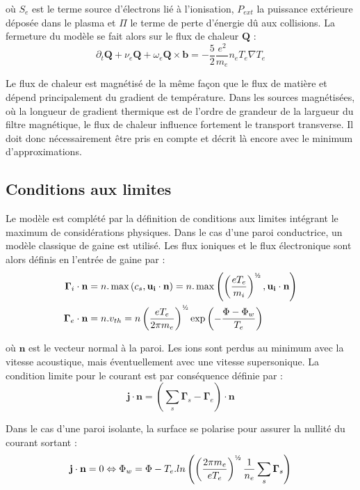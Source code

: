où $S_e$ est le terme source d'électrons lié à l'ionisation, $P_{ext}$ la puissance extérieure déposée dans le plasma
 et $\Pi$ le terme de perte d'énergie dû aux collisions. La fermeture du modèle se fait alors sur le flux de chaleur $\mathbf{Q}$ 
 \cite{Golant} :
\begin{equation}
	\partial_t \mathbf{Q} + \nu_e\mathbf{Q}+\omega_e\mathbf{Q}\times\mathbf{b} = -\frac{5}{2}\frac{e^2}{m_e}n_eT_e\nabla T_e
\end{equation}

Le flux de chaleur est magnétisé de la même façon que le flux de matière et dépend principalement 
du gradient de température. Dans les sources magnétisées, où la longueur de gradient thermique est de 
l'ordre de grandeur de la largueur du filtre magnétique, le flux de chaleur influence fortement le transport
transverse. Il doit donc nécessairement être pris en compte et décrit là encore avec le minimum d'approximations.
 
\subsection{Conditions aux limites}
Le modèle est complété par la définition de conditions aux limites intégrant le maximum de 
considérations physiques. Dans le cas d'une paroi conductrice, un modèle classique de gaine est utilisé. Les 
flux ioniques et le flux électronique sont alors définis en l'entrée de gaine par : 
\begin{align}
	\boldsymbol{\Gamma}_i\cdot\mathbf{n}&=n.\max\left(c_s,\mathbf{u_i}\cdot\mathbf{n}\right)=n.\max\left(\left(\frac{eT_e}{m_i}\right)^{\text{\textonehalf}},\mathbf{u_i}\cdot\mathbf{n}\right)
	\\
	\boldsymbol{\Gamma}_e\cdot\mathbf{n}&=n.v_{th}=n\left(\frac{eT_e}{2\pi m_e}\right)^{\text{\textonehalf}}\exp\left({-\frac{\Phi-\Phi_w}{T_e}}\right)
\end{align}

où $\mathbf{n}$ est le vecteur normal à la paroi. Les ions sont perdus au minimum avec la vitesse acoustique, 
mais éventuellement avec une vitesse supersonique. La condition limite pour le courant est par conséquence définie 
par :
\begin{equation}
	\mathbf{j}\cdot\mathbf{n}=\left(\sum_s\boldsymbol{\Gamma}_s-\boldsymbol{\Gamma}_e\right)\cdot\mathbf{n}
\end{equation}

Dans le cas d'une paroi isolante, la surface se polarise pour assurer la nullité du courant sortant :
\begin{equation}\begin{split}
	\mathbf{j}\cdot\mathbf{n}=0\Leftrightarrow
	\Phi_w=\Phi-T_e.ln\left(\left(\frac{2\pi m_e}{eT_e}\right)^{\text{\textonehalf}}\frac{1}{n_e}\sum_s \boldsymbol{\Gamma}_s\right)
\end{split}\end{equation}


